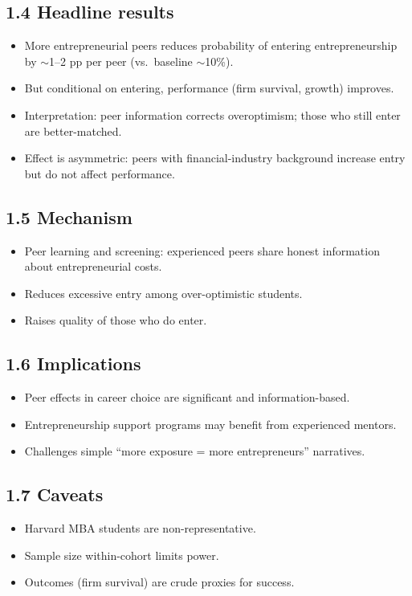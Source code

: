 \documentclass[11pt]{article}
\begin{document}
\subsection*{1.4 Headline results}
\begin{itemize}
\item More entrepreneurial peers reduces probability of entering entrepreneurship by $\sim$1--2 pp per peer (vs.\ baseline $\sim$10\%).
\item But conditional on entering, performance (firm survival, growth) improves.
\item Interpretation: peer information corrects overoptimism; those who still enter are better-matched.
\item Effect is asymmetric: peers with financial-industry background increase entry but do not affect performance.
\end{itemize}

\subsection*{1.5 Mechanism}
\begin{itemize}
\item Peer learning and screening: experienced peers share honest information about entrepreneurial costs.
\item Reduces excessive entry among over-optimistic students.
\item Raises quality of those who do enter.
\end{itemize}

\subsection*{1.6 Implications}
\begin{itemize}
\item Peer effects in career choice are significant and information-based.
\item Entrepreneurship support programs may benefit from experienced mentors.
\item Challenges simple ``more exposure = more entrepreneurs'' narratives.
\end{itemize}

\subsection*{1.7 Caveats}
\begin{alertbox}
\begin{itemize}
\item Harvard MBA students are non-representative.
\item Sample size within-cohort limits power.
\item Outcomes (firm survival) are crude proxies for success.
\end{itemize}
\end{alertbox}
\end{document}

